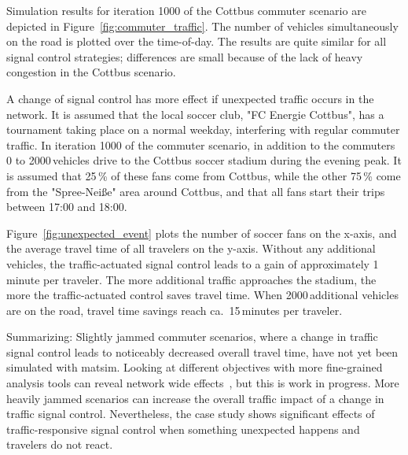 Simulation results for iteration 1000 of the Cottbus commuter scenario are depicted in Figure~\ref{fig:commuter_traffic}. The number of vehicles simultaneously on the road is plotted over the time-of-day. The results are quite similar for all signal control strategies; differences are small because of the lack of heavy congestion in the Cottbus scenario. 

A change of signal control has more effect if unexpected traffic occurs in the network. It is assumed that the local soccer club, "FC Energie Cottbus", has a tournament taking place on a normal weekday, interfering with regular commuter traffic. In iteration 1000 of the commuter scenario, in addition to the commuters 0 to 2000\,vehicles drive to the Cottbus soccer stadium during the evening peak. It is assumed that 25\,\% of these fans come from Cottbus, while the other 75\,\% come from the "Spree-Nei{\ss}e" area around Cottbus, and that all fans start their trips between 17:00 and 18:00. 

Figure~\ref{fig:unexpected_event} plots the number of soccer fans on the x-axis, and the average travel time of all travelers on the y-axis. Without any additional vehicles, the traffic-actuated signal control leads to a gain of approximately 1\,minute per traveler. The more additional traffic approaches the stadium, the more the traffic-actuated control saves travel time. When 2000\,additional vehicles are on the road, travel time savings reach ca.~15\,minutes per traveler. 

Summarizing: Slightly jammed commuter scenarios, where a change in traffic signal control leads to noticeably decreased overall travel time, have not yet been simulated with \gls{matsim}. Looking at different objectives with more fine-grained analysis tools can reveal network wide effects~\citep[e.g.,\,see the analysis using macroscopic fundamental diagrams][pp.114]{Grether2014PhD}, but this is work in progress. More heavily jammed scenarios can increase the overall traffic impact of a change in traffic signal control. Nevertheless, the case study shows significant effects of traffic-responsive signal control when something unexpected happens and travelers do not react.  

